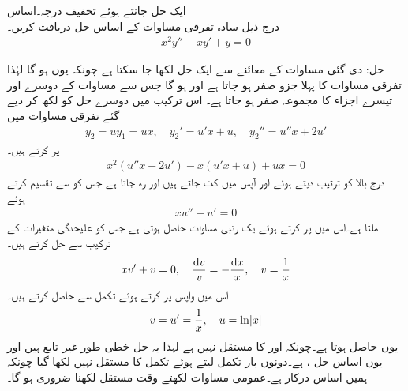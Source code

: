 \quad ایک حل جانتے ہوئے تخفیف درجہ۔اساس\\
درج ذیل سادہ تفرقی مساوات کے اساس حل دریافت کریں۔
\begin{align*}
x^2y''-xy'+y=0
\end{align*}

حل: \quad
دی گئی مساوات کے معائنے سے ایک حل  لکھا جا سکتا ہے چونکہ یوں  ہو گا لہٰذا تفرقی مساوات کا پہلا جزو صفر ہو جاتا ہے  اور  ہو گا جس سے مساوات کے دوسرے اور تیسرے اجزاء کا مجموعہ صفر ہو جاتا ہے۔ اس ترکیب میں دوسرے حل کو  لکھ کر دیے گئے تفرقی مساوات میں
\begin{align*}
y_2=uy_1=ux, \quad y_2'=u'x+u, \quad y_2''=u''x+2u'
\end{align*}
 پر کرتے ہیں۔
\begin{align*}
x^2(u''x+2u')-x(u'x+u)+ux=0
\end{align*}
درج بالا کو ترتیب دیتے ہوئے   اور  آپس میں کٹ جاتے ہیں اور  رہ جاتا ہے جس کو  سے تقسیم کرتے ہوئے
\begin{align*}
xu''+u'=0
\end{align*}
ملتا ہے۔اس میں  پر کرتے ہوئے یک رتبی مساوات حاصل ہوتی ہے جس کو علیحدگی متغیرات کے ترکیب سے حل کرتے ہیں۔
\begin{align*}
xv'+v=0,\quad \frac{\dif v}{v}=-\frac{\dif x}{x}, \quad v=\frac{1}{x}
\end{align*}
اس میں واپس  پر کرتے ہوئے تکمل سے  حاصل کرتے ہیں۔
\begin{align*}
v=u'=\frac{1}{x},\quad u=\ln \abs{x}
\end{align*}
یوں  حاصل ہوتا ہے۔چونکہ  اور   کا  مستقل نہیں ہے لہٰذا یہ حل خطی طور غیر تابع ہیں اور یوں اساس حل ،  ہے۔دونوں بار تکمل لیتے ہوئے تکمل کا مستقل نہیں لکھا گیا چونکہ ہمیں اساس درکار ہے۔عمومی مساوات لکھتے وقت مستقل لکھنا ضروری ہو گا۔

